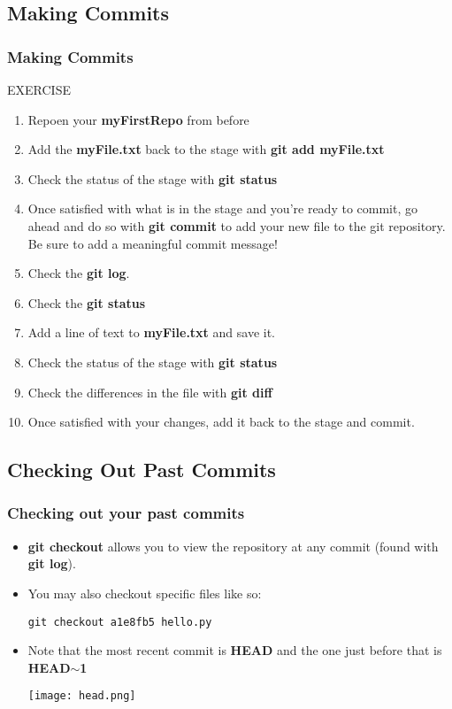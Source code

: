 \documentclass{beamer}
\begin{document}
\subsection{Making Commits}

\begin{frame}
\frametitle{Making Commits}
    \begin{block}{EXERCISE}
        \begin{enumerate}
        \item Repoen your \textbf{myFirstRepo} from before
	 \item Add the \textbf{myFile.txt} back to the stage with \textbf{git add myFile.txt}
	 \item Check the status of the stage with \textbf{git status}
        \item Once satisfied with what is in the stage and you're ready to commit, go ahead and do so with \textbf{git commit} to add your new file to the git repository. Be sure to add a meaningful commit message!
        \item Check the \textbf{git log}.
	 \item Check the \textbf{git status}
 	 \item Add a line of text to \textbf{myFile.txt} and save it.
	 \item Check the status of the stage with \textbf{git status}
	 \item Check the differences in the file with \textbf{git diff}
	 \item Once satisfied with your changes, add it back to the stage and commit. 
        \end{enumerate}
    \end{block}
\end{frame}

\subsection{Checking Out Past Commits}

\begin{frame}[fragile]
\frametitle{Checking out your past commits}
\begin{itemize}
\item \textbf{git checkout} allows you to view the repository at any commit (found with \textbf{git log}).
\item You may also checkout specific files like so: 
        \begin{lstlisting}
git checkout a1e8fb5 hello.py
        \end{lstlisting}
\item Note that the most recent commit is \textbf{HEAD} and the one just before that is \textbf{HEAD$\mathbf{\sim}$1}
\begin{center}\texttt{[image: head.png]}\end{center}
\end{itemize}
\end{frame}
\end{document}
